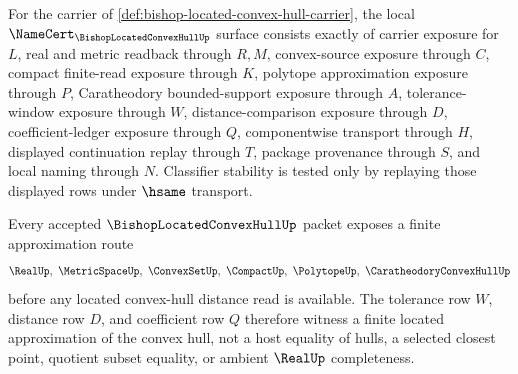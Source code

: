 \begin{theorem}
\label{thm:bishop-located-convex-hull-namecert-obligations}
For the carrier of \autoref{def:bishop-located-convex-hull-carrier}, the local $\NameCert_{\BishopLocatedConvexHullUp}$ surface consists exactly of carrier exposure for $L$, real and metric readback through $R,M$, convex-source exposure through $C$, compact finite-read exposure through $K$, polytope approximation exposure through $P$, Caratheodory bounded-support exposure through $A$, tolerance-window exposure through $W$, distance-comparison exposure through $D$, coefficient-ledger exposure through $Q$, componentwise transport through $H$, displayed continuation replay through $T$, package provenance through $S$, and local naming through $N$. Classifier stability is tested only by replaying those displayed rows under $\hsame$ transport.
\end{theorem}

\begin{theorem}
\label{thm:bishop-located-convex-hull-finite-approximation}
Every accepted $\BishopLocatedConvexHullUp$ packet exposes a finite approximation route
$$
\RealUp,\ \MetricSpaceUp,\ \ConvexSetUp,\ \CompactUp,\ \PolytopeUp,\ \CaratheodoryConvexHullUp
$$
before any located convex-hull distance read is available. The tolerance row $W$, distance row $D$, and coefficient row $Q$ therefore witness a finite located approximation of the convex hull, not a host equality of hulls, a selected closest point, quotient subset equality, or ambient $\RealUp$ completeness.
\end{theorem}




